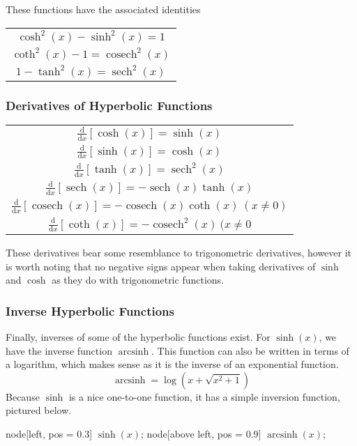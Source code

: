 \documentclass[12pt]{report}
\newenvironment{formulalist}{
    \renewcommand{\arraystretch}{2}
    \begin{center}    
        \begin{tabular}{||c||}
}{
        \end{tabular}
    \end{center}
    \renewcommand{\arraystretch}{1}
}
\newcommand{\derivx}[1]{\frac{\mathrm{d}}{\mathrm{d}x}\left[#1\right]}
\DeclareMathOperator{\sech}{sech}
\DeclareMathOperator{\cosech}{cosech}
\DeclareMathOperator{\arcsinh}{arcsinh}
\begin{document}
\begin{flushleft}
These functions have the associated identities

\begin{formulalist}
    \(\cosh^2(x) - \sinh^2(x) = 1\) \\
    \(\coth^2(x) - 1 = \cosech^2(x)\) \\
    \(1 - \tanh^2(x) = \sech^2(x)\) \\
\end{formulalist}

\subsubsection*{Derivatives of Hyperbolic Functions}

\begin{formulalist}
    \(\derivx{\cosh(x)} = \sinh(x)\) \\
    \(\derivx{\sinh(x)} = \cosh(x)\) \\
    \(\derivx{\tanh(x)} = \sech^2(x)\) \\
    \(\derivx{\sech(x)} = -\sech(x)\tanh(x)\) \\
    \(\derivx{\cosech(x)} = -\cosech(x)\coth(x) \:(x \neq 0)\) \\
    \(\derivx{\coth(x)} = -\cosech^2(x) \:(x \neq 0\) \\ 
\end{formulalist}

These derivatives bear some resemblance to trigonometric derivatives,
however it is worth noting that no negative signs appear when taking
derivatives of \(\sinh\) and \(\cosh\) as they do with trigonometric
functions.

\subsubsection*{Inverse Hyperbolic Functions}

Finally, inverses of some of the hyperbolic functions exist. For
\(\sinh(x)\), we have the inverse function \(\arcsinh\). This function can
also be written in terms of a logarithm, which makes sense as it is the inverse
of an exponential function.
\[\arcsinh = \log(x + \sqrt{x^2 + 1})\]
Because \(\sinh\) is a nice one-to-one function, it has a simple inversion 
function, pictured below.

\begin{plot}
    node[left, pos = 0.3] {\(\sinh(x)\)};
    node[above left, pos = 0.9] {\(\arcsinh(x)\)};
\end{plot}


\end{flushleft}
\end{document}
